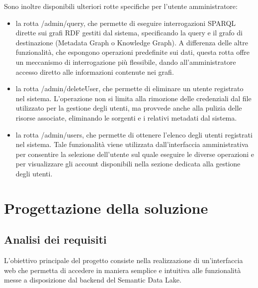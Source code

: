 \documentclass[13.6pt,a4paper]{report}
\begin{document}
\noindent
Sono inoltre disponibili ulteriori rotte specifiche per l'utente amministratore:
\begin{itemize}
    \item la rotta \colorbox{gray!15}{/admin/query}, che permette di eseguire interrogazioni SPARQL dirette sui grafi RDF gestiti dal sistema, specificando la query e il grafo di destinazione (Metadata Graph o Knowledge Graph). A differenza delle altre funzionalità, che espongono operazioni predefinite sui dati, questa rotta offre un meccanismo di interrogazione più flessibile, dando all'amministratore accesso diretto alle informazioni contenute nei grafi.
    
    \item la rotta \colorbox{gray!15}{/admin/deleteUser}, che permette di eliminare un utente registrato nel sistema. L'operazione non si limita alla rimozione delle credenziali dal file utilizzato per la gestione degli utenti, ma provvede anche alla pulizia delle risorse associate, eliminando le sorgenti e i relativi metadati dal sistema.

    \item la rotta \colorbox{gray!15}{/admin/users}, che permette di ottenere l'elenco degli utenti registrati nel sistema. Tale funzionalità viene utilizzata dall'interfaccia amministrativa per consentire la selezione dell'utente sul quale eseguire le diverse operazioni e per visualizzare gli account disponibili nella sezione dedicata alla gestione degli utenti.
\end{itemize}




\chapter{Progettazione della soluzione}

\section{Analisi dei requisiti}

L'obiettivo principale del progetto consiste nella realizzazione di un'interfaccia web che permetta di accedere in maniera semplice e intuitiva alle funzionalità messe a disposizione dal backend del Semantic Data Lake.
\end{document}
